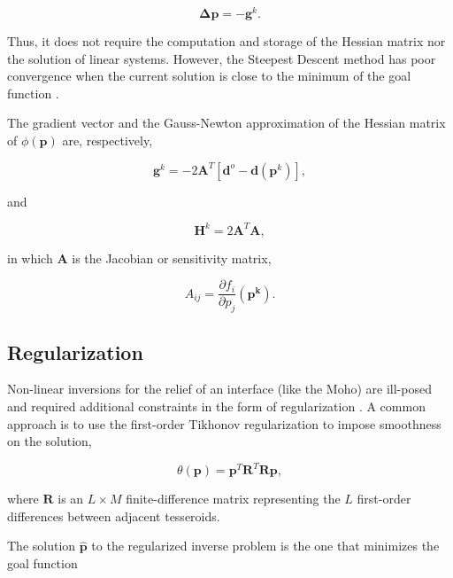 \documentclass[extra,mreferee]{gji}
\begin{document}
\begin{equation}
    \mathbf{\Delta p} = -\mathbf{g}^k.
    \label{eq:steepest}
\end{equation}

\noindent
Thus, it does not require the computation and storage of the Hessian matrix
nor the solution of linear systems.
However, the Steepest Descent method has poor convergence when the
current solution is close to the minimum of the goal function
\citep{kelley_iterative_1987}.

The gradient vector and the Gauss-Newton approximation of the Hessian matrix
of $\phi(\mathbf{p})$ are, respectively,

\begin{equation}
    \mathbf{g}^k = -2\mathbf{A}^T[\mathbf{d}^o - \mathbf{d}(\mathbf{p}^k)],
    \label{eq:gradient}
\end{equation}

\noindent
and

\begin{equation}
    \mathbf{H}^k = 2\mathbf{A}^T\mathbf{A},
    \label{eq:hessian}
\end{equation}

\noindent in which
$\mathbf{A}$ is the Jacobian or sensitivity matrix,

\begin{equation}
    A_{ij} = \dfrac{\partial f_i}{\partial p_j}(\mathbf{p^k}).
    \label{eq:jacobian}
\end{equation}



\subsection{Regularization}

Non-linear inversions for the relief of an interface (like
the Moho) are ill-posed and required additional constraints in the form of
regularization \citep{silva_potential-field_2001}.
A common approach is to use the first-order Tikhonov regularization to impose
smoothness on the solution,

\begin{equation}
    \theta(\mathbf{p}) = \mathbf{p}^T\mathbf{R}^T\mathbf{R}\mathbf{p},
\end{equation}

\noindent where $\mathbf{R}$ is an $L \times M$ finite-difference matrix
representing the $L$ first-order differences between adjacent tesseroids.

The solution $\hat{\mathbf{p}}$ to the regularized inverse problem is the one that
minimizes the goal function
\end{document}
